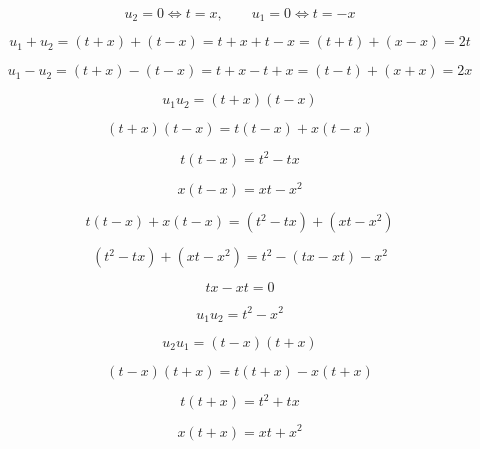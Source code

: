 \documentclass[12pt]{article}
\begin{document}
\begin{equation}
u_2=0\iff t=x,
\qquad
u_1=0\iff t=-x
\end{equation}

\begin{equation}
u_1+u_2
=(t+x)+(t-x)
=t+x+t-x
=(t+t)+(x-x)
=2t
\end{equation}

\begin{equation}
u_1-u_2
=(t+x)-(t-x)
=t+x-t+x
=(t-t)+(x+x)
=2x
\end{equation}

\begin{equation}
u_1u_2=(t+x)(t-x)
\end{equation}

\begin{equation}
(t+x)(t-x)=t(t-x)+x(t-x)
\end{equation}

\begin{equation}
t(t-x)=t^2-tx
\end{equation}

\begin{equation}
x(t-x)=xt-x^2
\end{equation}

\begin{equation}
t(t-x)+x(t-x)=(t^2-tx)+(xt-x^2)
\end{equation}

\begin{equation}
(t^2-tx)+(xt-x^2)=t^2-(tx-xt)-x^2
\end{equation}

\begin{equation}
tx-xt=0
\end{equation}

\begin{equation}
u_1u_2=t^2-x^2
\end{equation}

\begin{equation}
u_2u_1=(t-x)(t+x)
\end{equation}

\begin{equation}
(t-x)(t+x)=t(t+x)-x(t+x)
\end{equation}

\begin{equation}
t(t+x)=t^2+tx
\end{equation}

\begin{equation}
x(t+x)=xt+x^2
\end{equation}
\end{document}
